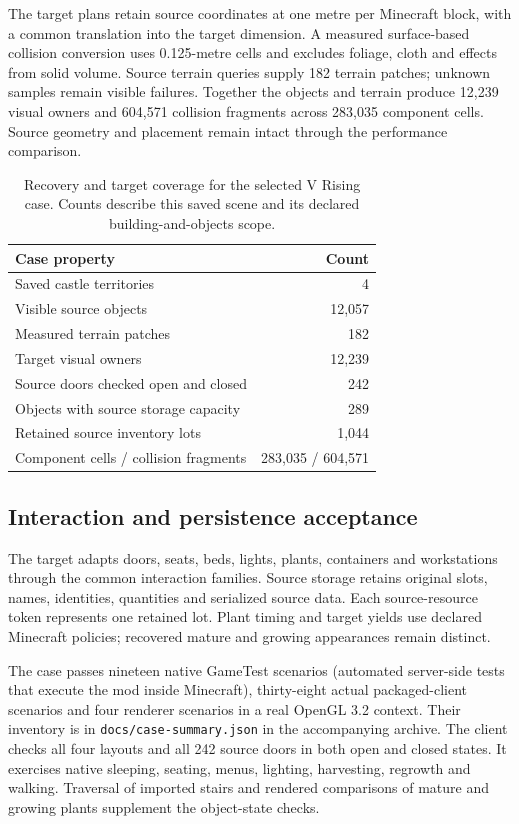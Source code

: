 \documentclass[11pt]{article}
\begin{document}
The target plans retain source coordinates at one metre per Minecraft block,
with a common translation into the target dimension. A measured surface-based
collision conversion uses 0.125-metre cells and excludes foliage, cloth and
effects from solid volume. Source terrain queries supply 182 terrain patches;
unknown samples remain visible failures. Together the objects and terrain
produce 12,239 visual owners and 604,571 collision fragments across 283,035
component cells. Source geometry and placement remain intact through the
performance comparison.

\begin{table}[t]
\centering
\begin{tabular}{lr}
\toprule
Case property & Count\\
\midrule
Saved castle territories & 4\\
Visible source objects & 12,057\\
Measured terrain patches & 182\\
Target visual owners & 12,239\\
Source doors checked open and closed & 242\\
Objects with source storage capacity & 289\\
Retained source inventory lots & 1,044\\
Component cells / collision fragments & 283,035 / 604,571\\
\bottomrule
\end{tabular}
\caption{Recovery and target coverage for the selected V Rising case. Counts
describe this saved scene and its declared building-and-objects scope.}
\label{tab:coverage}
\end{table}

\subsection{Interaction and persistence acceptance}

The target adapts doors, seats, beds, lights, plants, containers and workstations
through the common interaction families. Source storage retains original slots,
names, identities, quantities and serialized source data. Each source-resource
token represents one retained lot. Plant timing and target yields use declared
Minecraft policies; recovered mature and growing appearances remain distinct.

The case passes nineteen native GameTest scenarios (automated server-side
tests that execute the mod inside Minecraft), thirty-eight actual packaged-client
scenarios and four renderer scenarios in a real OpenGL 3.2 context. Their
inventory is in \texttt{docs/case-summary.json} in the accompanying archive.
The client checks all four layouts and all 242 source doors in both open and
closed states. It
exercises native sleeping, seating, menus, lighting, harvesting, regrowth and
walking. Traversal of imported stairs and rendered comparisons of mature and
growing plants supplement the object-state checks.
\end{document}
